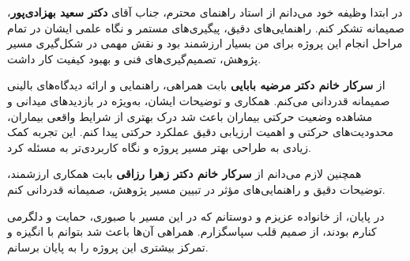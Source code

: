 \begin{Acknowledgements}
	در ابتدا وظیفه خود می‌دانم از استاد راهنمای محترم، جناب آقای 
	\textbf{دکتر سعید بهزادی‌پور}،
	 صمیمانه تشکر کنم. راهنمایی‌های دقیق، پیگیری‌های مستمر و نگاه علمی ایشان در تمام مراحل انجام این پروژه برای من بسیار ارزشمند بود و نقش مهمی در شکل‌گیری مسیر پژوهش، تصمیم‌گیری‌های فنی و بهبود کیفیت کار داشت.
	
	از 
	\textbf{سرکار خانم دکتر مرضیه بابایی}
	 بابت همراهی، راهنمایی و ارائه دیدگاه‌های بالینی صمیمانه قدردانی می‌کنم. همکاری و توضیحات ایشان، به‌ویژه در بازدیدهای میدانی و مشاهده وضعیت حرکتی بیماران باعث شد درک بهتری از شرایط واقعی بیماران، محدودیت‌های حرکتی و اهمیت ارزیابی دقیق عملکرد حرکتی پیدا کنم. این تجربه کمک زیادی به طراحی بهتر مسیر پروژه و نگاه کاربردی‌تر به مسئله کرد.
	
	همچنین لازم می‌دانم از 
	\textbf{سرکار خانم دکتر زهرا رزاقی}
	 بابت همکاری ارزشمند، توضیحات دقیق و راهنمایی‌های مؤثر در تبیین مسیر پژوهش، صمیمانه قدردانی کنم.
	
	در پایان، از خانواده عزیزم و دوستانم که در این مسیر با صبوری، حمایت و دلگرمی کنارم بودند، از صمیم قلب سپاسگزارم. همراهی آن‌ها باعث شد بتوانم با انگیزه و تمرکز بیشتری این پروژه را به پایان برسانم.
	
\end{Acknowledgements}
